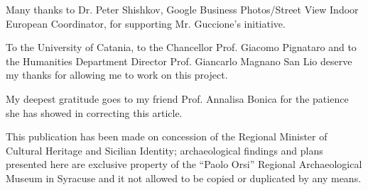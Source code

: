 \documentclass[amsthm,ebook]{saparticle}
\begin{document}
Many thanks to Dr. Peter Shishkov, Google Business Photos/Street View Indoor European Coordinator, for supporting Mr.
Guccione’s initiative.

To the University of Catania, to the Chancellor Prof. Giacomo Pignataro and to the Humanities Department Director Prof.
Giancarlo Magnano San Lio deserve my thanks for allowing me to work on this project.

My deepest gratitude goes to my friend Prof. Annalisa Bonica for the patience she has showed in correcting this
article.

This publication has been made on concession of the Regional Minister of Cultural Heritage and Sicilian Identity;
archaeological findings and plans presented here are exclusive property of the ``Paolo Orsi'' Regional Archaeological
Museum in Syracuse and it not allowed to be copied or duplicated by any means.

\nocite{Farman}


\end{document}
